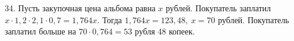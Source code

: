 34. Пусть закупочная цена альбома равна $x$ рублей. Покупатель заплатил $x\cdot1,2\cdot2,1\cdot0,7=1,764x.$ Тогда $1,764x=123,48,\ x=70$ рублей. Покупатель заплатил больше на $70\cdot0,764=53$ рубля 48 копеек.\\
